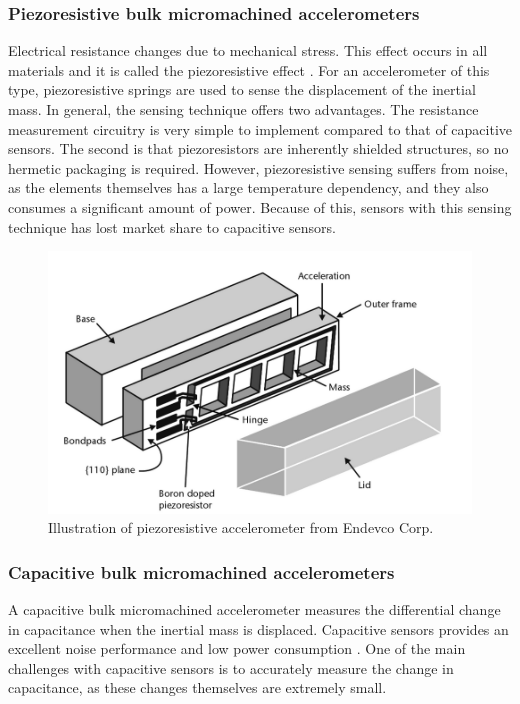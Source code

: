 \subsubsection{Piezoresistive bulk micromachined accelerometers}

Electrical resistance changes due to mechanical stress. This effect occurs in all materials and it is called the piezoresistive effect \cite[p.~73]{kaajakari09}. For an accelerometer of this type, piezoresistive springs are used to sense the displacement of the inertial mass. In general, the sensing technique offers two advantages. The resistance measurement circuitry is very simple to implement compared to that of capacitive sensors. The second is that piezoresistors are inherently shielded structures, so no hermetic packaging is required. However, piezoresistive sensing suffers from noise, as the elements themselves has a large temperature dependency, and they also consumes a significant amount of power. Because of this, sensors with this sensing technique has lost market share to capacitive sensors.

\begin{figure}[h]
\centering
\includegraphics[scale=0.3]{fig/piezoresistive.png}
\caption{Illustration of piezoresistive accelerometer from Endevco Corp. \cite[p.~98]{maluf04}}
\label{fig:piezoresistive_accel}
\end{figure}

\subsubsection{Capacitive bulk micromachined accelerometers}

A capacitive bulk micromachined accelerometer measures the differential change in capacitance when the inertial mass is displaced. Capacitive sensors provides an excellent noise performance and low power consumption \cite[p.~91]{kaajakari09}. One of the main challenges with capacitive sensors is to accurately measure the change in capacitance, as these changes themselves are extremely small. 

